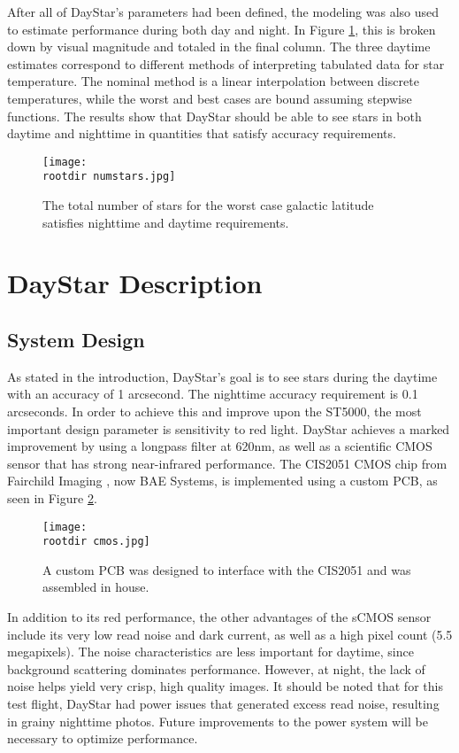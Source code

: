 \documentclass[twocolumn,letterpaper]{IEEEAerospace2012}
\newcommand{\rootdir}{./Figures/}
\begin{document}
After all of DayStar's parameters had been defined, the modeling was also used to estimate performance during both day and night. In Figure \ref{fig:numstars}, this is broken down by visual magnitude and totaled in the final column. The three daytime estimates correspond to different methods of interpreting tabulated data for star temperature. The nominal method is a linear interpolation between discrete temperatures, while the worst and best cases are bound assuming stepwise functions. The results show that DayStar should be able to see stars in both daytime and nighttime in quantities that satisfy accuracy requirements.
\begin{figure}
    \texttt{[image: \\rootdir numstars.jpg]}
    \caption{The total number of stars for the worst case galactic latitude satisfies nighttime and daytime requirements.}
    \label{fig:numstars}
\end{figure}

\section{DayStar Description}

\subsection{System Design}
As stated in the introduction, DayStar's goal is to see stars during the daytime with an accuracy of 1 arcsecond. The nighttime accuracy requirement is 0.1 arcseconds. In order to achieve this and improve upon the ST5000, the most important design parameter is sensitivity to red light. DayStar achieves a marked improvement by using a longpass filter at 620nm, as well as a scientific CMOS sensor that has strong near-infrared performance. The CIS2051 CMOS chip from Fairchild Imaging \cite{fairchild}, now BAE Systems, is implemented using a custom PCB, as seen in Figure \ref{fig:cmos}.
\begin{figure}[H]
    \texttt{[image: \\rootdir cmos.jpg]}
    \caption{A custom PCB was designed to interface with the CIS2051 and was assembled in house.}
    \label{fig:cmos}
\end{figure}
In addition to its red performance, the other advantages of the sCMOS sensor include its very low read noise and dark current, as well as a high pixel count (5.5 megapixels). The noise characteristics are less important for daytime, since background scattering dominates performance. However, at night, the lack of noise helps yield very crisp, high quality images. It should be noted that for this test flight, DayStar had power issues that generated excess read noise, resulting in grainy nighttime photos. Future improvements to the power system will be necessary to optimize performance.
\end{document}
